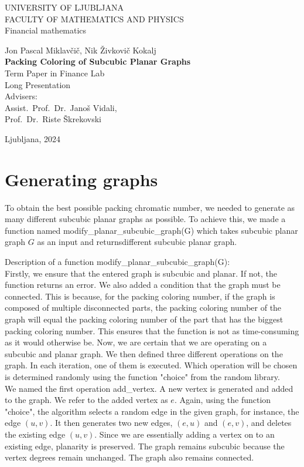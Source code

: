 \documentclass[12pt,a4paper]{amsart}
\theoremstyle{definition}
\theoremstyle{plain}
\newcommand{\program}{Financial mathematics}
\newcommand{\imeavtorja}{Jon Pascal Miklavčič, Nik Živkovič Kokalj}
\newcommand{\imementorja}{Assist.~Prof.~Dr.~Janoš Vidali}
\newcommand{\imesomentorja}{Prof.~Dr.~Riste Škrekovski}
\newcommand{\naslovdela}{Packing Coloring of Subcubic Planar Graphs}
\newcommand{\letnica}{2024}
\begin{document}
\thispagestyle{empty}
{\large
\noindent UNIVERSITY OF LJUBLJANA\\[1mm]
FACULTY OF MATHEMATICS AND PHYSICS\\[5mm]
\program\ }
\vfill

\begin{center}{\large
\imeavtorja\\[2mm]
{\bf \Large \naslovdela}\\[10mm]
{\normalsize Term Paper in Finance Lab}\\[1mm]
{\normalsize Long Presentation}\\[1cm]
{\normalsize Advisers:}\\
{\normalsize \imementorja, \\ \imesomentorja}\\[2mm]}
\end{center}
\vfill

{\large Ljubljana, \letnica}
\pagebreak

\section{Generating graphs}
To obtain the best possible packing chromatic number, we needed to generate as many different subcubic planar graphs as 
possible.  To achieve this, we made a function named modify\_planar\_subcubic\_graph(G) which takes subcubic planar graph $G$ 
as an input and returnsdifferent subcubic planar graph.

Description of a function modify\_planar\_subcubic\_graph(G):\\

Firstly, we ensure that the entered graph is subcubic and planar. If not, the function returns an error. We also added a 
condition that the graph must be connected. This is because, for the packing coloring number, if the graph is composed of 
multiple disconnected parts, the packing coloring number of the graph will equal the packing coloring number of the part 
that has the biggest packing coloring number. This ensures that the function is not as time-consuming as it would otherwise 
be. Now, we are certain that we are operating on a subcubic and planar graph. We then defined three different operations 
on the graph. In each iteration, one of them is executed. Which operation will be chosen is determined randomly using the 
function "choice" from the random library. \\

We named the first operation add\_vertex. A new vertex is generated and added to the graph. 
We refer to the added vertex as $e$. Again, using the function "choice", the algorithm selects a random edge in the 
given graph, for instance, the edge $(u, v)$. It then generates two new edges, $(e, u)$ and $(e, v)$, and deletes the 
existing edge $(u, v)$. Since we are essentially adding a vertex on to an existing edge, planarity is preserved. The graph 
remains subcubic because the vertex degrees remain unchanged. The graph also remains connected. \\
\end{document}
